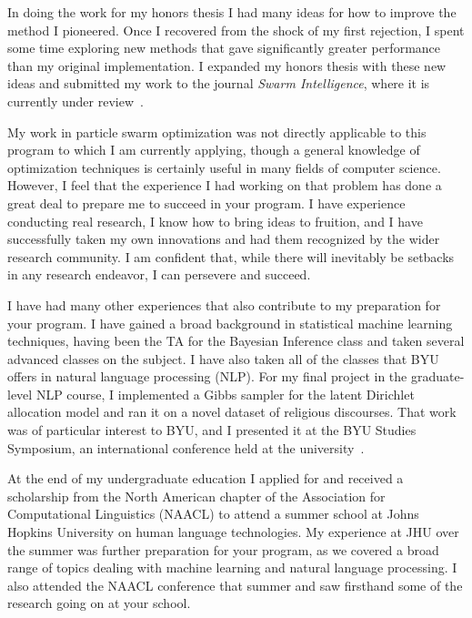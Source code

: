 \documentclass[onecolumn, 12pt]{article}
\begin{document}
In doing the work for my honors thesis I had many ideas for how to improve the
method I pioneered.  Once I recovered from the shock of my first rejection, I
spent some time exploring new methods that gave significantly greater
performance than my original implementation.  I expanded my honors thesis with
these new ideas and submitted my work to the journal \emph{Swarm Intelligence},
where it is currently under
review~\cite{gardner-2010-speculative-approach-to-parallelization-pso}.

My work in particle swarm optimization was not directly applicable to this
program to which I am currently applying, though a general knowledge of
optimization techniques is certainly useful in many fields of computer science.
However, I feel that the experience I had working on that problem has done a
great deal to prepare me to succeed in your program.  I have experience
conducting real research, I know how to bring ideas to fruition, and I have
successfully taken my own innovations and had them recognized by the wider
research community.  I am confident that, while there will inevitably be
setbacks in any research endeavor, I can persevere and succeed.

I have had many other experiences that also contribute to my preparation for
your program.  I have gained a broad background in statistical machine learning
techniques, having been the TA for the Bayesian Inference class and taken
several advanced classes on the subject.  I have also taken all of the classes
that BYU offers in natural language processing (NLP).  For my final project in
the graduate-level NLP course, I implemented a Gibbs sampler for the latent
Dirichlet allocation model and ran it on a novel dataset of religious
discourses.  That work was of particular interest to BYU, and I presented it at
the BYU Studies Symposium, an international conference held at the
university~\cite{gardner-2010-general-conference-topics}.

At the end of my undergraduate education I applied for and received a
scholarship from the North American chapter of the Association for
Computational Linguistics (NAACL) to attend a summer school at Johns Hopkins
University on human language technologies.  My experience at JHU over the
summer was further preparation for your program, as we covered a broad range of
topics dealing with machine learning and natural language processing.  I also
attended the NAACL conference that summer and saw firsthand some of the
research going on at your school.
\end{document}
